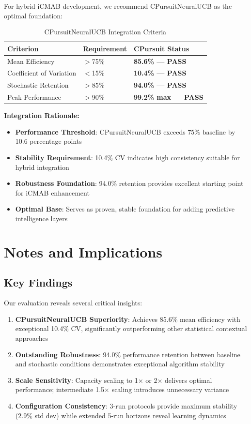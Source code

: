 \documentclass[12pt,a4paper]{article}
\newcommand{\primarytext}[1]{\textcolor{primaryblue}{\textbf{#1}}}
\newcommand{\secondarytext}[1]{\textcolor{secondaryblue}{\textbf{#1}}}
\newcommand{\success}[1]{\textcolor{accentgreen}{\textbf{#1}}}
\begin{document}
For hybrid iCMAB development, we recommend CPursuitNeuralUCB as the optimal foundation:

\begin{table}[H]
\centering
\caption{CPursuitNeuralUCB Integration Criteria}
\begin{tabular}{@{}lll@{}}
\toprule
\textbf{Criterion} & \textbf{Requirement} & \textbf{CPursuit Status} \\
\midrule
Mean Efficiency & $>$75\% & \success{85.6\% — PASS} \\
Coefficient of Variation & $<$15\% & \success{10.4\% — PASS} \\
Stochastic Retention & $>$85\% & \success{94.0\% — PASS} \\
Peak Performance & $>$90\% & \success{99.2\% max — PASS} \\
\bottomrule
\end{tabular}
\end{table}

\textbf{Integration Rationale:}
\begin{itemize}
\item \primarytext{Performance Threshold}: CPursuitNeuralUCB exceeds 75\% baseline by 10.6 percentage points
\item \success{Stability Requirement}: 10.4\% CV indicates high consistency suitable for hybrid integration
\item \primarytext{Robustness Foundation}: 94.0\% retention provides excellent starting point for iCMAB enhancement
\item \success{Optimal Base}: Serves as proven, stable foundation for adding predictive intelligence layers
\end{itemize}

\newpage
\section{Notes and Implications}

\subsection{Key Findings}

Our evaluation reveals several critical insights:

\begin{enumerate}
\item \primarytext{CPursuitNeuralUCB Superiority}: Achieves 85.6\% mean efficiency with exceptional 10.4\% CV, significantly outperforming other statistical contextual approaches
\item \success{Outstanding Robustness}: 94.0\% performance retention between baseline and stochastic conditions demonstrates exceptional algorithm stability
\item \secondarytext{Scale Sensitivity}: Capacity scaling to 1× or 2× delivers optimal performance; intermediate 1.5× scaling introduces unnecessary variance
\item \primarytext{Configuration Consistency}: 3-run protocols provide maximum stability (2.9\% std dev) while extended 5-run horizons reveal learning dynamics
\end{enumerate}
\end{document}
